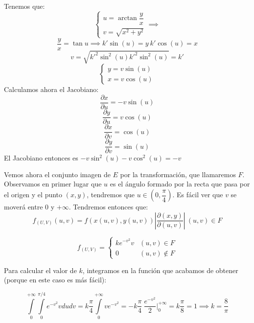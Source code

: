 \documentclass[openany]{book}
\begin{document}
\begin{exercise}
    $ $\\
    Tenemos que:
    $$ \left\{
    \begin{array}{l}
        u=\arctan \dfrac{y}{x}\\
        v = \sqrt{x^2+y^2}  
    \end{array}
    \right. \implies $$
 $$       \dfrac{y}{x} = \tan u \implies k'\sin(u) = y\ k'\cos(u) = x$$
 $$ v = \sqrt{k'^2 \sin^2(u) k'^2\sin^2(u)} = k'$$
 $$ \left\{
 \begin{array}{l}
     y=v \sin(u)\\
     x = v \cos(u)
 \end{array}
 \right. $$
 Calculamos ahora el Jacobiano:
 $$ \dfrac{\partial x}{\partial u} = -v \sin(u) $$
 $$ \dfrac{\partial y}{\partial u} = v \cos(u) $$
 $$ \dfrac{\partial x}{\partial v}= \cos(u) $$
 $$ \dfrac{\partial y}{\partial v}= \sin(u) $$
 El Jacobiano entonces es $ -v \sin^2(u)-v \cos^2(u) = -v $

 Vemos ahora el conjunto imagen de $ E $ por la transformación, que llamaremos $ F $. Observamos en primer lugar que $ u $ es el ángulo formado por la recta que pasa por el origen y el punto $ (x,y) $, tendremos que $ u \in (0,\dfrac{\pi}{4}) $. Es fácil ver que $ v $ se moverá entre 0 y $ +\infty $. Tendremos entonces que:
 $$ f_{(U,V)}(u,v) = f(x(u,v),y(u,v)) | \dfrac{\partial (x,y)}{\partial (u,v)}|\ (u,v) \in F$$

 $$ f_{(U,V)} =\left\{
 \begin{array}{ll}
      k e ^{-v^2}v & (u,v) \in F\\
     0 & (u,v) \not  \in F
 \end{array}
 \right. $$

Para calcular el valor de $ k $, integramos en la función que acabamos de obtener (porque en este caso es más fácil):

$$ \int\limits_{0}^{+\infty} \int\limits_{0}^{\pi/4} e^{-v^2}vdu dv = k \dfrac{\pi}{4} \int\limits_{0}^{+\infty}v e^{-v^2} = -k \dfrac{\pi}{4}\ \dfrac{e^{-v^2}}{2} \Biggr|_{0}^{+\infty} = k \dfrac{\pi}{8}=1 \implies k = \dfrac{8}{\pi} $$

\end{exercise}
\end{document}
